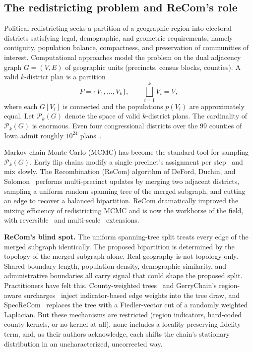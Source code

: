 \documentclass[11pt]{article}
\begin{document}
\subsection{The redistricting problem and ReCom's role}\label{sec:intro-problem}

Political redistricting seeks a partition of a geographic region into
electoral districts satisfying legal, demographic, and geometric
requirements, namely contiguity, population balance, compactness, and
preservation of communities of interest. Computational approaches model
the problem on the dual adjacency graph $G = (V,E)$ of geographic units
(precincts, census blocks, counties). A valid $k$-district plan is a
partition
\[
  P = \{V_1, \ldots, V_k\}, \qquad \bigsqcup_{i=1}^k V_i = V,
\]
where each $G[V_i]$ is connected and the populations $p(V_i)$ are
approximately equal. Let $\mathcal{P}_k(G)$ denote the space of valid
$k$-district plans. The cardinality of $\mathcal{P}_k(G)$ is enormous.
Even four congressional districts over the 99 counties of Iowa admit
roughly $10^{24}$ plans~\cite{fifield2020essential}.

Markov chain Monte Carlo (MCMC) has become the standard tool for
sampling $\mathcal{P}_k(G)$. Early flip chains modify a single
precinct's assignment per step~\cite{fifield2020automated} and mix
slowly. The Recombination (ReCom) algorithm of DeFord, Duchin, and
Solomon~\cite{deford2021recombination} performs multi-precinct updates
by merging two adjacent districts, sampling a uniform random spanning
tree of the merged subgraph, and cutting an edge to recover a balanced
bipartition. ReCom dramatically improved the mixing efficiency of
redistricting MCMC and is now the workhorse of the field, with
reversible~\cite{cannon2022spanning} and multi-scale~\cite{autry2020multiscale}
extensions.

\textbf{ReCom's blind spot.} The uniform spanning-tree split treats
every edge of the merged subgraph identically. The proposed
bipartition is determined by the topology of the merged subgraph
alone. Real geography is not topology-only. Shared boundary
length, population density, demographic similarity, and
administrative boundaries all carry signal that could shape the
proposed split. Practitioners have felt this. County-weighted
trees~\cite{clelland2022colorado} and GerryChain's region-aware
surcharges~\cite{gerrychain2024} inject indicator-based edge weights
into the tree draw, and SpecReCom~\cite{davies2025spectral} replaces
the tree with a Fiedler-vector cut of a randomly weighted Laplacian.
But these mechanisms are restricted (region indicators, hard-coded
county kernels, or no kernel at all), none includes a
locality-preserving fidelity term, and, as their authors
acknowledge, each shifts the chain's stationary distribution in
an uncharacterized, uncorrected way.
\end{document}
